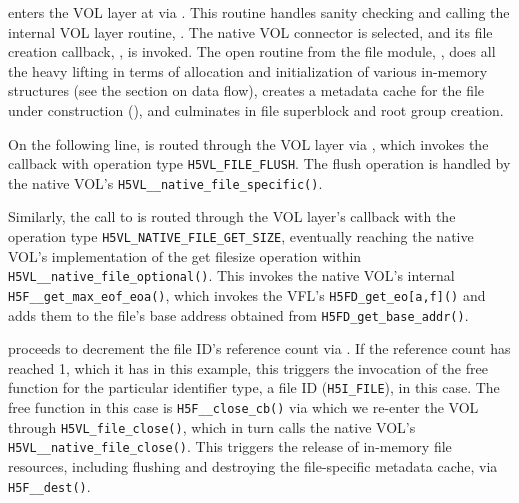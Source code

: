  enters the VOL layer at  via . This routine handles sanity checking and calling the internal VOL layer routine, . The native VOL connector is selected, and its file creation callback, , is invoked. The open routine from the file module, , does all the heavy lifting in terms of allocation and initialization of various in-memory structures (see the section on data flow), creates a metadata cache for the file under construction (), and culminates in file superblock and root group creation.

On the following line,  is routed through the VOL layer via , which invokes the  callback with operation type \texttt{H5VL\_FILE\_FLUSH}. The flush operation is handled by the native VOL's \texttt{H5VL\_\_native\_file\_specific()}.

Similarly, the call to  is routed through the VOL layer's  callback with the operation type \texttt{H5VL\_NATIVE\_FILE\_GET\_SIZE}, eventually reaching the native VOL's implementation of the get filesize operation within \texttt{H5VL\_\_native\_file\_optional()}. This invokes the native VOL's internal \texttt{H5F\_\_get\_max\_eof\_eoa()}, which invokes the VFL's \texttt{H5FD\_get\_eo[a,f]()} and adds them to the file's base address obtained from \texttt{H5FD\_get\_base\_addr()}.

 proceeds to decrement the file ID's reference count via . If the reference count has reached 1, which it has in this example, this triggers the invocation of the free function for the particular identifier type, a file ID (\texttt{H5I\_FILE}), in this case. The free function in this case is \texttt{H5F\_\_close\_cb()} via which we re-enter the VOL through \texttt{H5VL\_file\_close()}, which in turn calls the native VOL's \texttt{H5VL\_\_native\_file\_close()}. This triggers the release of in-memory file resources, including flushing and destroying the file-specific metadata cache, via \texttt{H5F\_\_dest()}.

